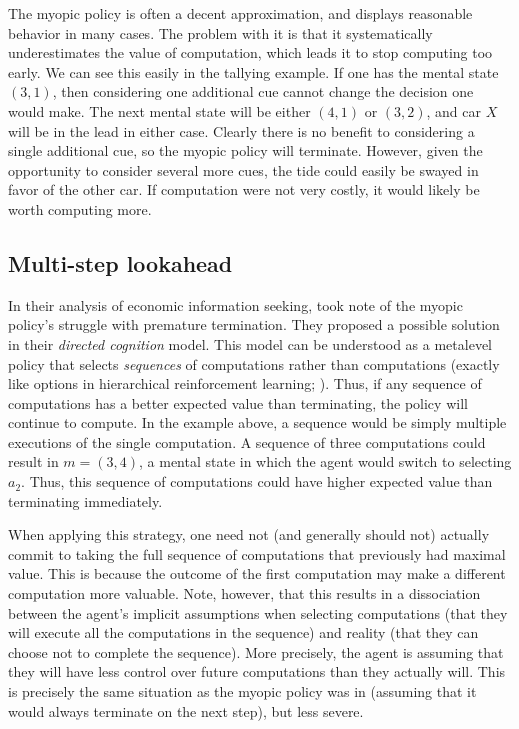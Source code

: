 The myopic policy is often a decent approximation, and displays reasonable behavior in many cases. The problem with it is that it systematically underestimates the value of computation, which leads it to stop computing too early. We can see this easily in the tallying example. If one has the mental state $(3, 1)$, then considering one additional cue cannot change the decision one would make. The next mental state will be either $(4, 1)$ or $(3, 2)$, and car $X$ will be in the lead in either case. Clearly there is no benefit to considering a single additional cue, so the myopic policy will terminate. However, given the opportunity to consider several more cues, the tide could easily be swayed in favor of the other car. If computation were not very costly, it would likely be worth computing more. 


\subsection{Multi-step lookahead}

In their analysis of economic information seeking, \citet{gabaix2005bounded} took note of the myopic policy's struggle with premature termination. They proposed a possible solution in their \emph{directed cognition} model. This model can be understood as a metalevel policy that selects \emph{sequences} of computations rather than computations (exactly like options in hierarchical reinforcement learning; \citealp{sutton1999mdps}). Thus, if any sequence of computations has a better expected value than terminating, the policy will continue to compute. In the example above, a sequence would be simply multiple executions of the single computation. A sequence of three computations could result in $m=(3,4)$, a mental state in which the agent would switch to selecting $a_2$. Thus, this sequence of computations could have higher expected value than terminating immediately.

When applying this strategy, one need not (and generally should not) actually commit to taking the full sequence of computations that previously had maximal value. This is because the outcome of the first computation may make a different computation more valuable. Note, however, that this results in a dissociation between the agent's implicit assumptions when selecting computations (that they will execute all the computations in the sequence) and reality (that they can choose not to complete the sequence). More precisely, the agent is assuming that they will have less control over future computations than they actually will. This is precisely the same situation as the myopic policy was in (assuming that it would always terminate on the next step), but less severe.

